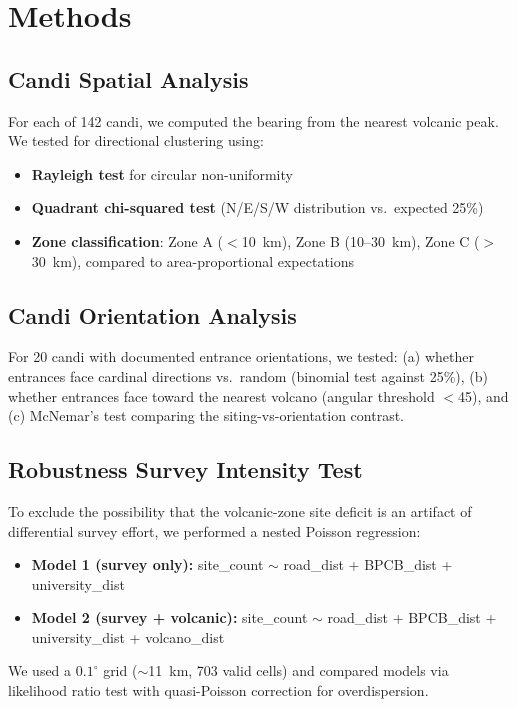\documentclass[12pt,a4paper]{article}
\begin{document}
\section{Methods}

\subsection{Candi Spatial Analysis}
\label{sec:spatial}

For each of 142 candi, we computed the bearing from the nearest volcanic peak. We tested for directional clustering using:
\begin{itemize}
    \item \textbf{Rayleigh test} for circular non-uniformity
    \item \textbf{Quadrant chi-squared test} (N/E/S/W distribution vs.\ expected 25\%)
    \item \textbf{Zone classification}: Zone A ($<$10~km), Zone B (10--30~km), Zone C ($>$30~km), compared to area-proportional expectations
\end{itemize}

\subsection{Candi Orientation Analysis}
\label{sec:orientation}

For 20 candi with documented entrance orientations, we tested: (a) whether entrances face cardinal directions vs.\ random (binomial test against 25\%), (b) whether entrances face toward the nearest volcano (angular threshold $<$45\textdegree), and (c) McNemar's test comparing the siting-vs-orientation contrast.

\subsection{Robustness Survey Intensity Test}
\label{sec:adv3}

To exclude the possibility that the volcanic-zone site deficit is an artifact of differential survey effort, we performed a nested Poisson regression:
\begin{itemize}
    \item \textbf{Model 1 (survey only):} site\_count $\sim$ road\_dist + BPCB\_dist + university\_dist
    \item \textbf{Model 2 (survey + volcanic):} site\_count $\sim$ road\_dist + BPCB\_dist + university\_dist + volcano\_dist
\end{itemize}
We used a $0.1^{\circ}$ grid ($\sim$11~km, 703 valid cells) and compared models via likelihood ratio test with quasi-Poisson correction for overdispersion.
\end{document}
